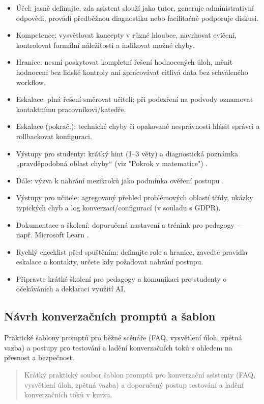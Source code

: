 \documentclass{report}%
\begin{document}
%
\begin{itemize}
\item Účel: jasně definujte, zda asistent slouží jako tutor, generuje administrativní odpovědi, provádí předběžnou diagnostiku nebo facilitačně podporuje diskusi.
\item Kompetence: vysvětlovat koncepty v různé hloubce, navrhovat cvičení, kontrolovat formální náležitosti a indikovat možné chyby.
\item Hranice: nesmí poskytovat kompletní řešení hodnocených úloh, měnit hodnocení bez lidské kontroly ani zpracovávat citlivá data bez schváleného workflow.
\item Eskalace: plná řešení směrovat učiteli; při podezření na podvody oznamovat kontaktnímu pracovníkovi/katedře.
\item Eskalace (pokrač.): technické chyby či opakované nesprávnosti hlásit správci a rollbackovat konfiguraci.
\item Výstupy pro studenty: krátký hint (1–3 věty) a diagnostická poznámka „pravděpodobná oblast chyby“ (viz "Pokrok v matematice") \cite{kb_ai_101_tipu_pdf_04e4a115_page_8_1}.
\item Dále: výzva k nahrání mezikroků jako podmínka ověření postupu \cite{kb_ai_101_tipu_pdf_04e4a115_page_8_1}.
\item Výstupy pro učitele: agregovaný přehled problémových oblastí třídy, ukázky typických chyb a log konverzací/configurací (v souladu s GDPR).
\item Dokumentace a školení: doporučená nastavení a trénink pro pedagogy — např. Microsoft Learn \cite{kb_ai_101_tipu_pdf_04e4a115_page_54_1}.
\item Rychlý checklist před spuštěním: definujte role a hranice, zaveďte pravidla eskalace a kontakty, určete kdy požadovat nahrání postupu.
\item Připravte krátké školení pro pedagogy a komunikaci pro studenty o očekáváních a deklaraci využití AI.
\end{itemize}%

%
\subsection{Návrh konverzačních promptů a šablon}%
Praktické šablony promptů pro běžné scénáře (FAQ, vysvětlení úloh, zpětná vazba) a postupy pro testování a ladění konverzačních toků s ohledem na přesnost a bezpečnost.%


%
\begin{quotation}Krátký praktický soubor šablon promptů pro konverzační asistenty (FAQ, vysvětlení úloh, zpětná vazba) a doporučený postup testování a ladění konverzačních toků v kurzu.\end{quotation}
\end{document}
